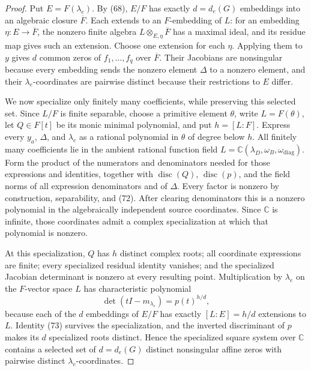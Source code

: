 \documentclass{article}
\begin{document}
\begin{proof}
Put \(E=F(\lambda_e)\).  By (68), \(E/F\) has exactly \(d=d_e(G)\) embeddings into an algebraic closure \(\overline F\).  Each extends to an \(F\)-embedding of \(L\): for an embedding \(\eta:E\to\overline F\), the nonzero finite algebra \(L\otimes_{E,\eta}\overline F\) has a maximal ideal, and its residue map gives such an extension.  Choose one extension for each \(\eta\).  Applying them to \(y\) gives \(d\) common zeros of \(f_1,\ldots,f_q\) over \(\overline F\).  Their Jacobians are nonsingular because every embedding sends the nonzero element \(\Delta\) to a nonzero element, and their \(\lambda_e\)-coordinates are pairwise distinct because their restrictions to \(E\) differ.

We now specialize only finitely many coefficients, while preserving this selected set.  Since \(L/F\) is finite separable, choose a primitive element \(\theta\), write \(L=F(\theta)\), let \(Q\in F[t]\) be its monic minimal polynomial, and put \(h=[L:F]\).  Express every \(y_a\), \(\Delta\), and \(\lambda_e\) as a rational polynomial in \(\theta\) of degree below \(h\).  All finitely many coefficients lie in the ambient rational function field \(L=\mathbb C(\lambda_D,\omega_B,\omega_{\mathrm{diag}})\).  Form the product of the numerators and denominators needed for those expressions and identities, together with \(\operatorname{disc}(Q)\), \(\operatorname{disc}(p)\), and the field norms of all expression denominators and of \(\Delta\).  Every factor is nonzero by construction, separability, and (72).  After clearing denominators this is a nonzero polynomial in the algebraically independent source coordinates.  Since \(\mathbb C\) is infinite, those coordinates admit a complex specialization at which that polynomial is nonzero.

At this specialization, \(Q\) has \(h\) distinct complex roots; all coordinate expressions are finite; every specialized residual identity vanishes; and the specialized Jacobian determinant is nonzero at every resulting point.  Multiplication by \(\lambda_e\) on the \(F\)-vector space \(L\) has characteristic polynomial
\[
 \det(tI-m_{\lambda_e})=p(t)^{h/d},
\tag{73}
\]
because each of the \(d\) embeddings of \(E/F\) has exactly \([L:E]=h/d\) extensions to \(L\).  Identity (73) survives the specialization, and the inverted discriminant of \(p\) makes its \(d\) specialized roots distinct.  Hence the specialized square system over \(\mathbb C\) contains a selected set of \(d=d_e(G)\) distinct nonsingular affine zeros with pairwise distinct \(\lambda_e\)-coordinates.


\end{proof}
\end{document}
